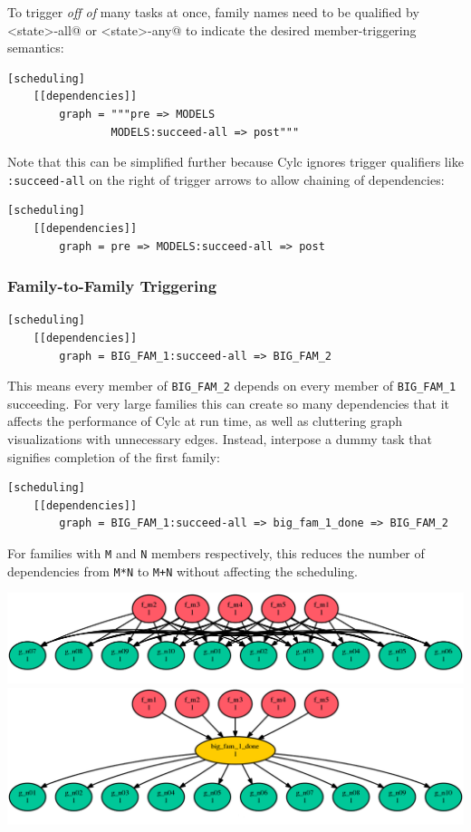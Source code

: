 To trigger {\em off of} many tasks at once, family names need to be qualified
by \lstinline@<state>-all@ or \lstinline@<state>-any@ to indicate the desired
member-triggering semantics:

\lstset{language=suiterc}
\begin{lstlisting}
[scheduling]
    [[dependencies]]
        graph = """pre => MODELS
                MODELS:succeed-all => post"""
\end{lstlisting}

Note that this can be simplified further because Cylc ignores trigger
qualifiers like \lstinline=:succeed-all= on the right of trigger arrows
to allow chaining of dependencies:

\lstset{language=suiterc}
\begin{lstlisting}
[scheduling]
    [[dependencies]]
        graph = pre => MODELS:succeed-all => post
\end{lstlisting}

\subsubsection{Family-to-Family Triggering}

\lstset{language=suiterc}
\begin{lstlisting}
[scheduling]
    [[dependencies]]
        graph = BIG_FAM_1:succeed-all => BIG_FAM_2
\end{lstlisting}

This means every member of \lstinline=BIG_FAM_2= depends on every member
of \lstinline=BIG_FAM_1= succeeding. For very large families this can create so
many dependencies that it affects the performance of Cylc at run time, as
well as cluttering graph visualizations with unnecessary edges. Instead,
interpose a dummy task that signifies completion of the first family:

\lstset{language=suiterc}
\begin{lstlisting}
[scheduling]
    [[dependencies]]
        graph = BIG_FAM_1:succeed-all => big_fam_1_done => BIG_FAM_2
\end{lstlisting}

For families with \lstinline=M= and \lstinline=N= members respectively, this 
reduces the number of dependencies from \lstinline=M*N= to \lstinline=M+N=
without affecting the scheduling.

\includegraphics[width=\textwidth]{resources/png/fam-to-fam-1.png}
\includegraphics[width=\textwidth]{resources/png/fam-to-fam-2.png}

